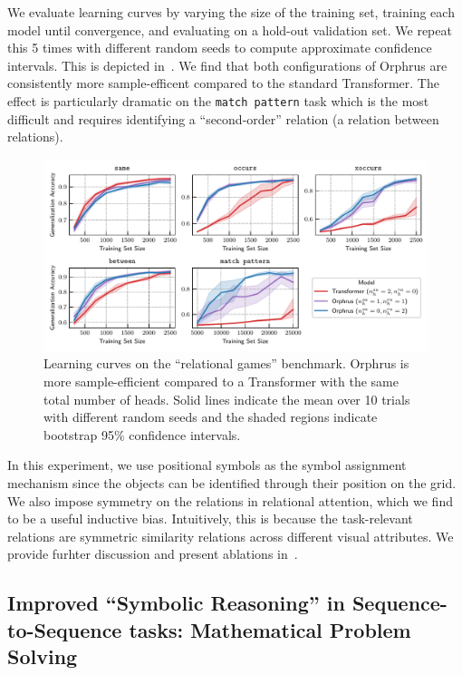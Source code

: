 We evaluate learning curves by varying the size of the training set, training each model until convergence, and evaluating on a hold-out validation set. We repeat this 5 times with different random seeds to compute approximate confidence intervals. This is depicted in~. We find that both configurations of Orphrus are consistently more sample-efficent compared to the standard Transformer. The effect is particularly dramatic on the \texttt{match pattern} task which is the most difficult and requires identifying a ``second-order'' relation (a relation between relations).

\begin{figure}
    \includegraphics[width=\textwidth]{figs/experiments/relgames/relgames_learning_curves.pdf}
    \caption{Learning curves on the ``relational games'' benchmark. Orphrus is more sample-efficient compared to a Transformer with the same total number of heads. Solid lines indicate the mean over 10 trials with different random seeds and the shaded regions indicate bootstrap 95\% confidence intervals.}\label{fig:relgames_learning_curves}
\end{figure}

In this experiment, we use positional symbols as the symbol assignment mechanism since the objects can be identified through their position on the grid. We also impose symmetry on the relations in relational attention, which we find to be a useful inductive bias. Intuitively, this is because the task-relevant relations are symmetric similarity relations across different visual attributes. We provide furhter discussion and present ablations in~.


\subsection{Improved ``Symbolic Reasoning'' in Sequence-to-Sequence tasks: Mathematical Problem Solving}\label{ssec:math}

